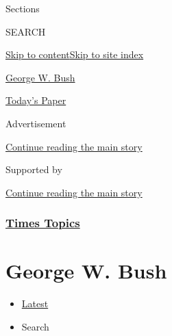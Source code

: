 Sections

SEARCH

\protect\hyperlink{site-content}{Skip to
content}\protect\hyperlink{site-index}{Skip to site index}

\href{https://www.nytimes3xbfgragh.onion/topic/person/george-w-bush}{George
W. Bush}

\href{https://myaccount.nytimes3xbfgragh.onion/auth/login?response_type=cookie\&client_id=vi}{}

\href{https://www.nytimes3xbfgragh.onion/section/todayspaper}{Today's
Paper}

Advertisement

\protect\hyperlink{after-top}{Continue reading the main story}

Supported by

\protect\hyperlink{after-sponsor}{Continue reading the main story}

\hypertarget{times-topics}{%
\subsubsection{\texorpdfstring{\href{/index.html}{Times
Topics}}{Times Topics}}\label{times-topics}}

\hypertarget{george-w-bush}{%
\section{George W. Bush}\label{george-w-bush}}

\begin{itemize}
\tightlist
\item
  \protect\hyperlink{stream-panel}{Latest}
\item
  Search
\end{itemize}

